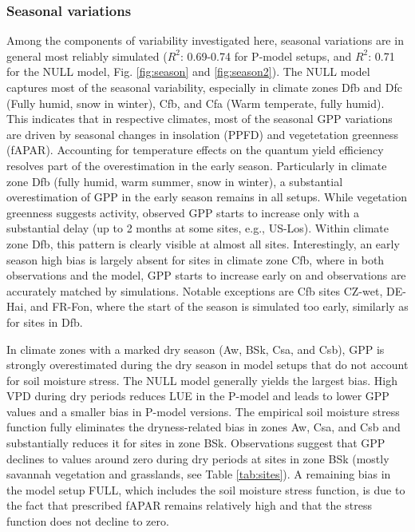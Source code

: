 \documentclass{myreport}
\newcommand{\rsq}{$R^2$}
\begin{document}
\subsubsection{Seasonal variations}
\label{sec:results_seasonal}
Among the components of variability investigated here, seasonal variations are in general most reliably simulated (\rsq : 0.69-0.74 for P-model setups, and \rsq : 0.71 for the NULL model, Fig. \ref{fig:season} and \ref{fig:season2}). The NULL model captures most of the seasonal variability, especially in climate zones Dfb and Dfc (Fully humid, snow in winter), Cfb, and Cfa (Warm temperate, fully humid). This indicates that in respective climates, most of the  seasonal GPP variations are driven by seasonal changes in insolation (PPFD) and vegetetation greenness (fAPAR). Accounting for temperature effects on the quantum yield efficiency resolves part of the overestimation in the early season. Particularly in climate zone Dfb (fully humid, warm summer, snow in winter), a substantial overestimation of GPP in the early season remains in all setups. While vegetation greenness suggests activity, observed GPP starts to increase only with a substantial delay (up to 2 months at some sites, e.g., US-Los). Within climate zone Dfb, this pattern is clearly visible at almost all sites. Interestingly, an early season high bias is largely absent for sites in climate zone Cfb, where in both observations and the model, GPP starts to increase early on and observations are accurately matched by simulations. Notable exceptions are Cfb sites CZ-wet, DE-Hai, and FR-Fon, where the start of the season is simulated too early, similarly as for sites in Dfb.

In climate zones with a marked dry season (Aw, BSk, Csa, and Csb), GPP is strongly overestimated during the dry season in model setups that do not account for soil moisture stress. The NULL model generally yields the largest bias. High VPD during dry periods reduces LUE in the P-model and leads to lower GPP values and a smaller bias in P-model versions. The empirical soil moisture stress function fully eliminates the dryness-related bias in zones Aw, Csa, and Csb and substantially reduces it for sites in zone BSk. Observations suggest that GPP declines to values around zero during dry periods at sites in zone BSk (mostly savannah vegetation and grasslands, see Table \ref{tab:sites}). A remaining bias in the model setup FULL, which includes the soil moisture stress function, is due to the fact that prescribed fAPAR remains relatively high and that the stress function does not decline to zero.
\end{document}
